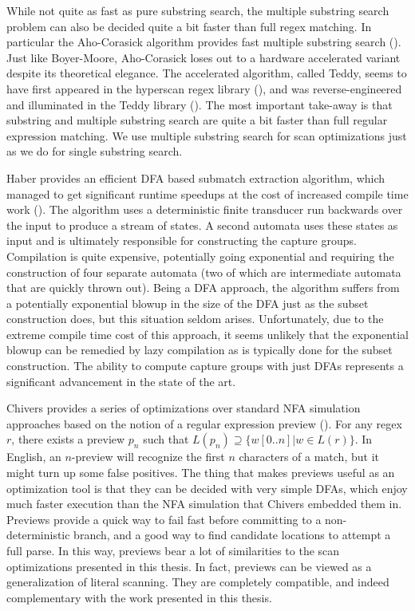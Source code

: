 While not quite as fast as pure substring search, the multiple
substring search problem can also be decided quite a bit faster than
full regex matching. In particular the Aho-Corasick algorithm provides
fast multiple substring search (\cite{Aho1975}). Just like Boyer-Moore,
Aho-Corasick loses out to a hardware accelerated variant despite its
theoretical elegance. The accelerated algorithm, called Teddy, seems
to have first appeared in the hyperscan regex library (\cite{hyperscan}),
and was reverse-engineered and illuminated in the Teddy library (\cite{Teddy}).
The most important take-away is that substring and multiple
substring search are quite a bit faster than full regular expression matching.
We use multiple substring search for scan optimizations just as we do for
single substring search.

Haber provides an efficient DFA based submatch extraction algorithm,
which managed to get significant runtime speedups at the cost of
increased compile time work (\cite{Haber2013}). The algorithm uses
a deterministic finite transducer run backwards over the input
to produce a stream of states. A second automata uses these
states as input and is ultimately responsible for constructing
the capture groups. Compilation is quite expensive, potentially
going exponential and requiring the construction of four separate
automata (two of which are intermediate automata that are quickly
thrown out). Being a DFA approach, the algorithm suffers from
a potentially exponential blowup in the size of the DFA just as
the subset construction does, but this situation seldom arises.
Unfortunately, due to the extreme compile time cost of this
approach, it seems unlikely that the exponential blowup can be
remedied by lazy compilation as is typically done for the subset
construction. The ability to compute capture groups with
just DFAs represents a significant advancement in the state of the art.

Chivers provides a series of optimizations over standard NFA simulation
approaches based on the notion of a regular expression preview
(\cite{Chivers2016}). For any regex $r$, there exists a preview $p_n$
such that $L(p_n) \supseteq \{ w[0..n] | w \in L(r) \}$. In English,
an $n$-preview will recognize the first $n$ characters
of a match, but it might turn up some false positives. The thing that
makes previews useful as an optimization tool is that they can be
decided with very simple DFAs, which enjoy much faster execution than
the NFA simulation that Chivers embedded them in. Previews provide
a quick way to fail fast before committing to a non-deterministic
branch, and a good way to find candidate locations to attempt a
full parse. In this way, previews bear a lot of similarities to the
scan optimizations presented in this thesis. In fact, previews can be
viewed as a generalization of literal scanning. They are completely
compatible, and indeed complementary with the work presented in this
thesis.


